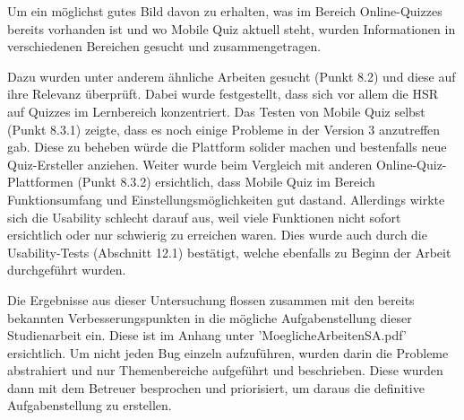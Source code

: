







Um ein möglichst gutes Bild davon zu erhalten, was im Bereich Online-Quizzes bereits vorhanden ist und wo Mobile Quiz aktuell steht, wurden Informationen in verschiedenen Bereichen gesucht und zusammengetragen.

Dazu wurden unter anderem ähnliche Arbeiten gesucht (Punkt 8.2) und diese auf ihre Relevanz überprüft. Dabei wurde festgestellt, dass sich vor allem die HSR auf Quizzes im Lernbereich konzentriert.
Das Testen von Mobile Quiz selbst (Punkt 8.3.1) zeigte, dass es noch einige Probleme in der Version 3 anzutreffen gab. Diese zu beheben würde die Plattform solider machen und bestenfalls neue Quiz-Ersteller anziehen.
Weiter wurde beim Vergleich mit anderen Online-Quiz-Plattformen (Punkt 8.3.2) ersichtlich, dass Mobile Quiz im Bereich Funktionsumfang und Einstellungsmöglichkeiten gut dastand. Allerdings wirkte sich die Usability schlecht darauf aus, weil viele Funktionen nicht sofort ersichtlich oder nur schwierig zu erreichen waren. Dies wurde auch durch die Usability-Tests (Abschnitt 12.1) bestätigt, welche ebenfalls zu Beginn der Arbeit durchgeführt wurden.

Die Ergebnisse aus dieser Untersuchung flossen zusammen mit den bereits bekannten Verbesserungspunkten in die mögliche Aufgabenstellung dieser Studienarbeit ein. Diese ist im Anhang unter 'MoeglicheArbeitenSA.pdf' ersichtlich. Um nicht jeden Bug einzeln aufzuführen, wurden darin die Probleme abstrahiert und nur Themenbereiche aufgeführt und beschrieben. Diese wurden dann mit dem Betreuer besprochen und priorisiert, um daraus die definitive Aufgabenstellung zu erstellen.

